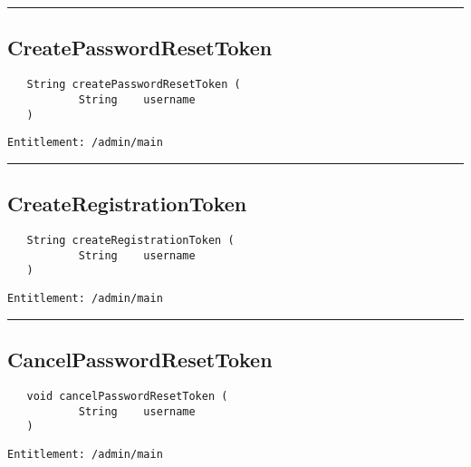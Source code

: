 \rule{12cm}{2pt}
\subsection{CreatePasswordResetToken}
\label{Api:CreatePasswordResetToken}
\begin{verbatim}
   String createPasswordResetToken (
           String    username
   )
\end{verbatim}
\begin{Verbatim}[fontsize=\small, formatcom=\color{Maroon}]
  Entitlement: /admin/main
\end{Verbatim}



\rule{12cm}{2pt}
\subsection{CreateRegistrationToken}
\label{Api:CreateRegistrationToken}
\begin{verbatim}
   String createRegistrationToken (
           String    username
   )
\end{verbatim}
\begin{Verbatim}[fontsize=\small, formatcom=\color{Maroon}]
  Entitlement: /admin/main
\end{Verbatim}



\rule{12cm}{2pt}
\subsection{CancelPasswordResetToken}
\label{Api:CancelPasswordResetToken}
\begin{verbatim}
   void cancelPasswordResetToken (
           String    username
   )
\end{verbatim}
\begin{Verbatim}[fontsize=\small, formatcom=\color{Maroon}]
  Entitlement: /admin/main
\end{Verbatim}



